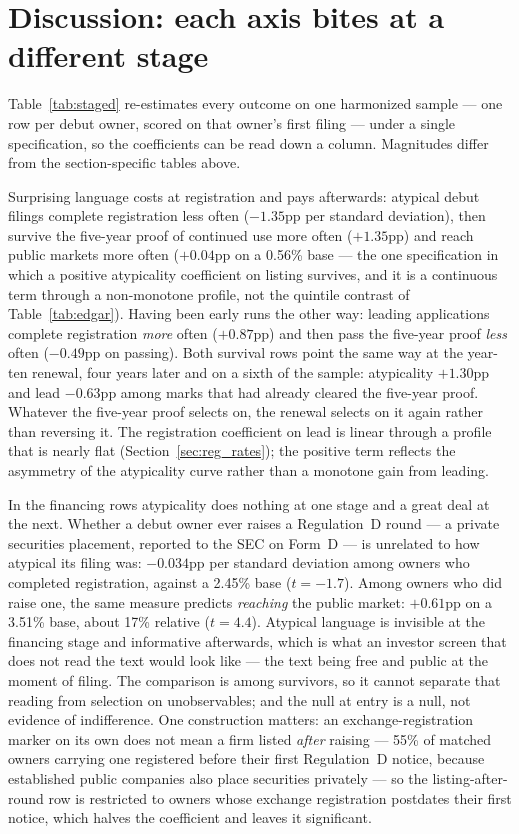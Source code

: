 \section{Discussion: each axis bites at a different stage}\label{sec:discussion}

Table~\ref{tab:staged} re-estimates every outcome on one harmonized
sample --- one row per debut owner, scored on that owner's first filing
--- under a single specification, so the coefficients can be read down a
column. Magnitudes differ from the section-specific tables above.



Surprising language costs at registration and pays afterwards: atypical
debut filings complete registration less often ($-1.35$pp per standard
deviation), then survive the five-year proof of continued use more often
($+1.35$pp) and reach public markets more often ($+0.04$pp on a 0.56\%
base --- the one specification in which a positive atypicality
coefficient on listing survives, and it is a continuous term through a
non-monotone profile, not the quintile contrast of
Table~\ref{tab:edgar}). Having been early runs the other way: leading
applications complete registration \emph{more} often ($+0.87$pp) and then
pass the five-year proof \emph{less} often ($-0.49$pp on passing). Both
survival rows point the same way at the year-ten renewal, four years
later and on a sixth of the sample: atypicality $+1.30$pp and lead
$-0.63$pp among marks that had already cleared the five-year proof.
Whatever the five-year proof selects on, the renewal selects on it again
rather than reversing it. The registration coefficient on lead is linear
through a profile that is nearly flat (Section~\ref{sec:reg_rates}); the
positive term reflects the asymmetry of the atypicality curve rather
than a monotone gain from leading.

In the financing rows atypicality does nothing at one stage and a great
deal at the next. Whether a debut owner ever raises a Regulation~D round
--- a private securities placement, reported to the SEC on Form~D --- is
unrelated to how atypical its filing was: $-0.034$pp per standard
deviation among owners who completed registration, against a 2.45\% base
($t = -1.7$). Among owners who did raise one, the same measure predicts
\emph{reaching} the public market: $+0.61$pp on a 3.51\% base, about 17\%
relative ($t = 4.4$). Atypical language is invisible at the financing stage and
informative afterwards, which is what an investor screen that does not
read the text would look like --- the text being free and public at the
moment of filing. The comparison is among survivors, so it cannot
separate that reading from selection on unobservables; and the null at
entry is a null, not evidence of indifference. One construction matters:
an exchange-registration marker on its own does not mean a firm listed
\emph{after} raising --- 55\% of matched owners carrying one registered
before their first Regulation~D notice, because established public
companies also place securities privately --- so the listing-after-round
row is restricted to owners whose exchange registration postdates their
first notice, which halves the coefficient and leaves it significant.

